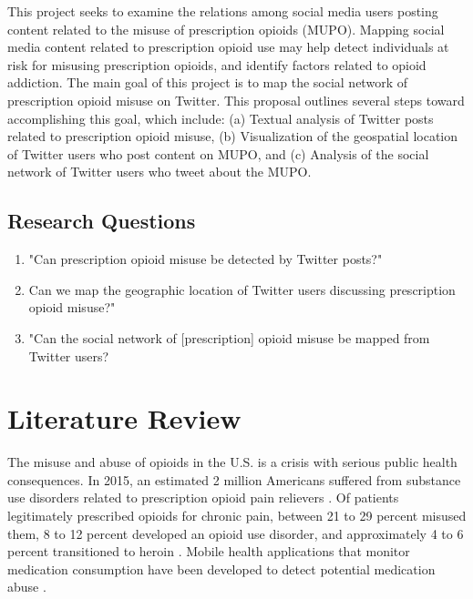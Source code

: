 \documentclass[sigconf]{acmart}
\begin{document}
This project seeks to examine the relations among social media users posting 
content related to the misuse of prescription opioids (MUPO). Mapping social 
media content related to prescription opioid use may help detect individuals 
at risk for misusing prescription opioids, and identify factors related to 
opioid addiction. The main goal of this project is to map the social network
of prescription opioid misuse on Twitter. This proposal outlines several steps 
toward accomplishing this goal, which include: (a) Textual analysis of Twitter 
posts related to prescription opioid misuse, (b) Visualization of the 
geospatial location of Twitter users who post content on MUPO, and (c) Analysis 
of the social network of Twitter users who tweet about the MUPO. 

\subsection{Research Questions} 
\begin{enumerate}
    \item "Can prescription opioid misuse be detected by Twitter posts?" 
    \item Can we map the geographic location of  Twitter users discussing 
    prescription opioid misuse?" 
    \item "Can the social network of [prescription] opioid misuse be mapped 
    from Twitter users?  
\end{enumerate}

\section{Literature Review} 

The misuse and abuse of opioids in the U.S. is a crisis with serious public 
health consequences. In 2015, an estimated 2 million Americans suffered from 
substance use disorders related to prescription opioid pain relievers 
\cite{nida18, cdc18}. Of patients legitimately prescribed opioids for chronic 
pain, between 21 to 29 percent misused them, 8 to 12 percent developed an 
opioid use disorder, and approximately 4 to 6 percent transitioned to heroin 
\cite{vowles15, carlson16}. Mobile health applications that monitor medication 
consumption have been developed to detect potential medication abuse 
\cite{varshney13}.
\end{document}
